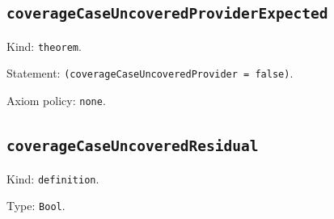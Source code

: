 \documentclass[11pt]{article}
\begin{document}
\subsection*{\texttt{coverageCaseUncoveredProviderExpected}}
\noindent Kind: \texttt{theorem}.\par
\noindent Statement: \texttt{(coverageCaseUncoveredProvider = false)}.\par
\noindent Axiom policy: \texttt{none}.\par
\subsection*{\texttt{coverageCaseUncoveredResidual}}
\noindent Kind: \texttt{definition}.\par
\noindent Type: \texttt{Bool}.\par
\end{document}
